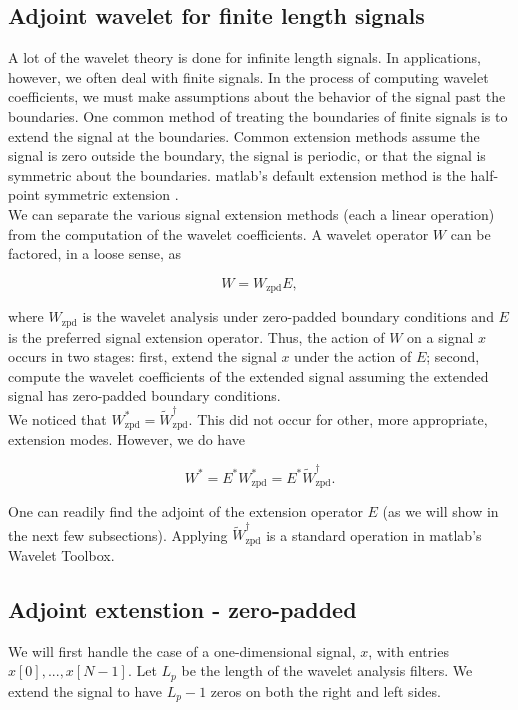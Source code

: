 \documentclass{article}
\theoremstyle{mystuff}
\theoremstyle{myexample}
\theoremstyle{named}
\begin{document}

\subsection{Adjoint wavelet for finite length signals}
A lot of the wavelet theory is done for infinite length signals.  In applications, however, we often deal with finite signals.  In the process of computing wavelet coefficients, we must make assumptions about the behavior of the signal past the boundaries.  One common method of treating the boundaries of finite signals is to extend the signal at the boundaries.  Common extension methods assume the signal is zero outside the boundary, the signal is periodic, or that the signal is symmetric about the boundaries.  {\sc matlab}'s default extension method is the half-point symmetric extension \cite{matlab_wt_2015, strang_1996}.\\

We can separate the various signal extension methods (each a linear operation) from the computation of the wavelet coefficients.  A wavelet operator $W$ can be factored, in a loose sense, as

\[ W = W_\text{zpd}E, \] 

\noindent where $W_\text{zpd}$ is the wavelet analysis under zero-padded boundary conditions and $E$ is the preferred signal extension operator.  Thus, the action of $W$ on a signal $x$ occurs in two stages: first, extend the signal $x$ under the action of $E$; second, compute the wavelet coefficients of the extended signal assuming the extended signal has zero-padded boundary conditions.\\

We noticed that $W^\ast_{\text{zpd}}=\widetilde{W}_{\text{zpd}}^\dagger$.  This did not occur for other, more appropriate, extension modes.  However, we do have

\[ W^\ast = E^\ast W^\ast_{\text{zpd}} = E^\ast \widetilde{W}^\dagger_\text{zpd}. \] 

\noindent One can readily find the adjoint of the extension operator $E$ (as we will show in the next few subsections).  Applying $\widetilde{W}^\dagger_\text{zpd}$ is a standard operation in {\sc matlab}'s Wavelet Toolbox.\\


\subsection{Adjoint extenstion - zero-padded}
We will first handle the case of a one-dimensional signal, $x$, with entries $x[0], ..., x[N-1]$.  Let $L_p$ be the length of the wavelet analysis filters.  We extend the signal to have $L_p-1$ zeros on both the right and left sides.
\end{document}
